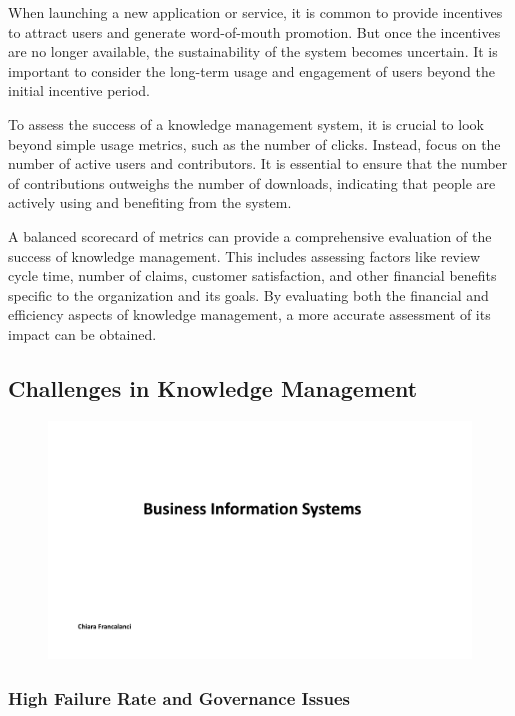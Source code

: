 When launching a new application or service, it is common to provide
incentives to attract users and generate word-of-mouth promotion. But
once the incentives are no longer available, the sustainability of the
system becomes uncertain. It is important to consider the long-term
usage and engagement of users beyond the initial incentive period.

To assess the success of a knowledge management system, it is crucial to
look beyond simple usage metrics, such as the number of clicks. Instead,
focus on the number of active users and contributors. It is essential to
ensure that the number of contributions outweighs the number of
downloads, indicating that people are actively using and benefiting from
the system.

A balanced scorecard of metrics can provide a comprehensive evaluation
of the success of knowledge management. This includes assessing factors
like review cycle time, number of claims, customer satisfaction, and
other financial benefits specific to the organization and its goals. By
evaluating both the financial and efficiency aspects of knowledge
management, a more accurate assessment of its impact can be obtained.

\subsection{Challenges in Knowledge
    Management}\label{challenges-in-knowledge-management}

\begin{figure}[!h]
    \centering
    \includegraphics[page=18, trim = 1.5cm 5.5cm 3cm 4cm, clip, width=\textwidth]{images/05 - KM.pdf}
\end{figure}

\subsubsection{High Failure Rate and Governance
    Issues}\label{high-failure-rate-and-governance-issues}

